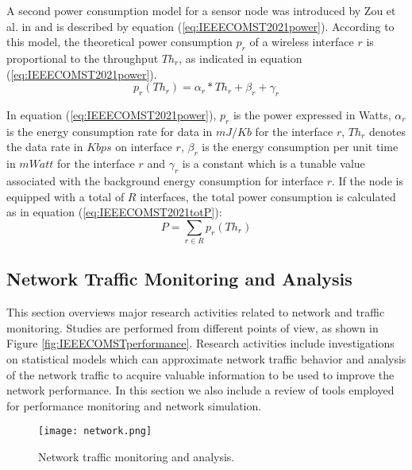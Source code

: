 A second power consumption model for a sensor node was introduced by Zou et al. in \cite{Zou2017} and is described by equation (\ref{eq:IEEECOMST2021power}). According to this model, the theoretical power consumption $p_{r}$ of a wireless interface $r$ is proportional to the throughput $Th_{r}$, as indicated in equation (\ref{eq:IEEECOMST2021power}).
\begin{equation}
	\label{eq:IEEECOMST2021power}
	p_{r}(Th_{r})=\alpha_{r}*Th_{r}+\beta_{r}+\gamma_{r}
\end{equation}

In equation (\ref{eq:IEEECOMST2021power}), $p_{r}$ is the power expressed in Watts, $\alpha_{r}$ is the energy consumption rate for data in $mJ/Kb$ for the interface $r$, $Th_{r}$ denotes the data rate in $Kbps$ on interface $r$, $\beta_{r}$ is the energy consumption per unit time in $mWatt$ for the interface $r$ and $\gamma_{r}$ is a constant which is a tunable value associated with the background energy consumption for interface $r$.
If the node is equipped with a total of $R$ interfaces, the total power consumption is calculated as in equation (\ref{eq:IEEECOMST2021totP}):
\begin{equation}
	\label{eq:IEEECOMST2021totP}
	P = \sum_{r\in R}p_{r}(Th_{r})
\end{equation}

\subsection{Network Traffic Monitoring and Analysis}
\label{sec:IEEECOMSTtraffic}

This section overviews major research activities related to network and traffic monitoring. Studies are performed from different points of view, as shown in Figure \ref{fig:IEEECOMSTperformance}. Research activities include investigations on statistical models which can approximate network traffic behavior and analysis of the network traffic to acquire valuable information to be used to improve the network performance. In this section we also include a review of tools employed for performance monitoring and network simulation.

\begin{figure}[htp]
	\centering
	\texttt{[image: network.png]}
	\caption{Network traffic monitoring and analysis.}
	\label{fig:IEEECOMSTnetwork}
	\vspace{-0.5cm}
\end{figure}


